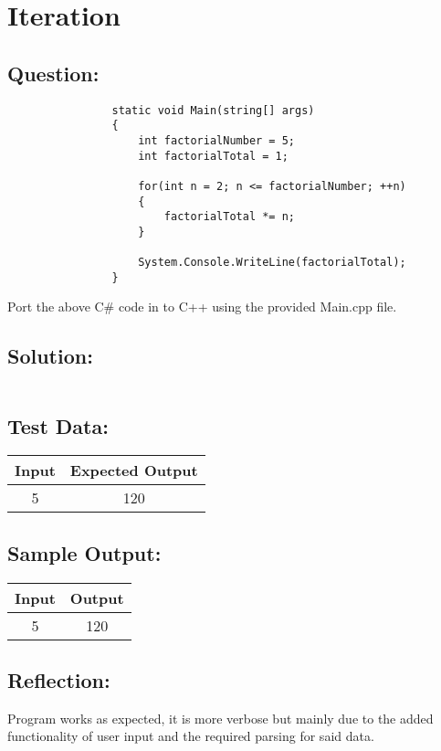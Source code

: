 \documentclass[main.tex]{subfiles}
\begin{document}
    \section{Iteration}
        \subsection*{Question:}
            \begin{verbatim}
                static void Main(string[] args)
                {
                    int factorialNumber = 5;
                    int factorialTotal = 1;

                    for(int n = 2; n <= factorialNumber; ++n)
                    {
                        factorialTotal *= n;
                    }

                    System.Console.WriteLine(factorialTotal);
                }
            \end{verbatim}
            Port the above C\# code in to C++ using the provided Main.cpp file.
            
        \subsection*{Solution:}
            \inputminted{cpp}{../Tasks/05-Iteration/Iteration.cpp}

        \newpage
        \subsection*{Test Data:}
            \begin{center}
                \begin{tabular}{c c}
                    \hline
                    \textbf{Input} & \textbf{Expected Output} \\
                    \hline
                    5 & 120 \\
                \end{tabular}
            \end{center}
        
        \subsection*{Sample Output:}
            \begin{center}
                \begin{tabular}{c c}
                    \hline
                    \textbf{Input} & \textbf{Output} \\
                    \hline
                    5 & 120 \\
                \end{tabular}
            \end{center}

        \subsection*{Reflection:}
            Program works as expected, it is more verbose but mainly due to the added functionality
            of user input and the required parsing for said data.
\end{document}
